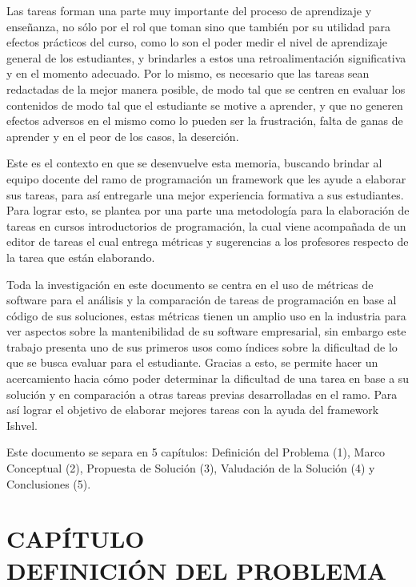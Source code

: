 \documentclass[letterpaper,12pt]{article}
\newcommand{\secnumbersection}[1]{
\addtocounter{section}{1}
\section*{CAPÍTULO \thesection \texorpdfstring{\\}\ #1}
\addcontentsline{toc}{section}{CAPÍTULO \thesection : #1}
\setcounter{subsection}{0}
}
\begin{document}
Las tareas forman una parte muy importante del proceso de aprendizaje y enseñanza, no sólo por el rol que toman sino que también por su utilidad para efectos prácticos del curso, como lo son el poder medir el nivel de aprendizaje general de los estudiantes, y brindarles a estos una retroalimentación significativa y en el momento adecuado. Por lo mismo, es necesario que las tareas sean redactadas de la mejor manera posible, de modo tal que se centren en evaluar los contenidos de modo tal que el estudiante se motive a aprender, y que no generen efectos adversos en el mismo como lo pueden ser la frustración, falta de ganas de aprender y en el peor de los casos, la deserción.

Este es el contexto en que se desenvuelve esta memoria, buscando brindar al equipo docente del ramo de programación un framework que les ayude a elaborar sus tareas, para así entregarle una mejor experiencia formativa a sus estudiantes. Para lograr esto, se plantea por una parte una metodología para la elaboración de tareas en cursos introductorios de programación, la cual viene acompañada de un editor de tareas el cual entrega métricas y sugerencias a los profesores respecto de la tarea que están elaborando.

Toda la investigación en este documento se centra en el uso de métricas de software para el análisis y la comparación de tareas de programación en base al código de sus soluciones, estas métricas tienen un amplio uso en la industria para ver aspectos sobre la mantenibilidad de su software empresarial, sin embargo este trabajo presenta uno de sus primeros usos como índices sobre la dificultad de lo que se busca evaluar para el estudiante. Gracias a esto, se permite hacer un acercamiento hacia cómo poder determinar la dificultad de una tarea en base a su solución y en comparación a otras tareas previas desarrolladas en el ramo. Para así lograr el objetivo de elaborar mejores tareas con la ayuda del framework Ishvel.

Este documento se separa en 5 capítulos: Definición del Problema (1), Marco Conceptual (2), Propuesta de Solución (3), Valudación de la Solución (4) y Conclusiones (5).

\newpage

\secnumbersection{DEFINICIÓN DEL PROBLEMA} \label{sec:problema}
\end{document}

